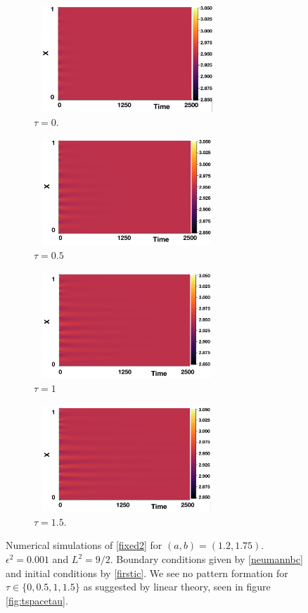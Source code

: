 \begin{figure}[H]
    \centering
    \begin{subfigure}[b]{0.45\textwidth}
        \centering
        \includegraphics[width=7cm,height=4cm]{p3t0.png}
        \caption{$\tau=0$.}
        \label{}
    \end{subfigure}
    \hfill
    \begin{subfigure}[b]{0.45\textwidth}
        \centering
        \includegraphics[width=7cm,height=4cm]{p3t05.png}
        \caption{$\tau=0.5$}
        \label{}
    \end{subfigure}
    \hfill
    \begin{subfigure}[b]{0.45\textwidth}
        \centering
        \includegraphics[width=7cm,height=4cm]{p3t1.png}
        \caption{$\tau=1$}
        \label{}
    \end{subfigure}
    \hfill
    \begin{subfigure}[b]{0.45\textwidth}
        \centering
        \includegraphics[width=7cm,height=4cm]{p3t15.png}
        \caption{$\tau=1.5$.}
        \label{}
    \end{subfigure}
    \caption{Numerical simulations of \eqref{fixed2} for $(a,b)=(1.2,1.75)$. $\epsilon^2=0.001$ and $L^2=9/2$. Boundary conditions given by \eqref{neumannbc} and initial conditions by \eqref{firstic}. We see no pattern formation for $\tau\in\{0,0.5,1,1.5\}$ as suggested by linear theory, seen in figure \ref{fig:tspacetau}.}
    \label{fig:testturing2}
\end{figure}

